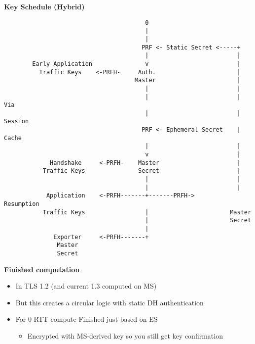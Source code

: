 \documentclass[helvetica]{seminar}
\newcommand{\heading}[1]{%
  \begin{center} 
    \large\bf 
    #1 
  \end{center} 
  \vspace{.4 in}}
\begin{document}
\begin{slide}
\heading{Key Schedule (Hybrid)}
{\tiny
\begin{verbatim}
                                        0
                                        |                         
                                        |                         
                                       PRF <- Static Secret <-----+
                                        |                         |
        Early Application               v                         |
          Traffic Keys    <-PRFH-     Auth.                       |
                                     Master                       |
                                        |                         |
                                        |                         | Via
                                        |                         | Session
                                       PRF <- Ephemeral Secret    | Cache
                                        |                         | 
                                        v                         |
             Handshake     <-PRFH-    Master                      |
           Traffic Keys               Secret                      |
                                        |                         |
                                        |                         |
            Application    <-PRFH-------+-------PRFH->        Resumption        
           Traffic Keys                 |                       Master
                                        |                       Secret  
                                        |
              Exporter     <-PRFH-------+
               Master
               Secret
\end{verbatim}
}
\end{slide}


\begin{slide}
\heading{Finished computation}

\begin{itemize}
\item In TLS 1.2 (and current 1.3 computed on MS)
\item But this creates a circular logic with static DH authentication
\item For 0-RTT compute Finished just based on ES
  \begin{itemize}
  \item Encrypted with MS-derived key so you still get key confirmation
  \end{itemize}
\end{itemize}

\end{slide}
\end{document}
